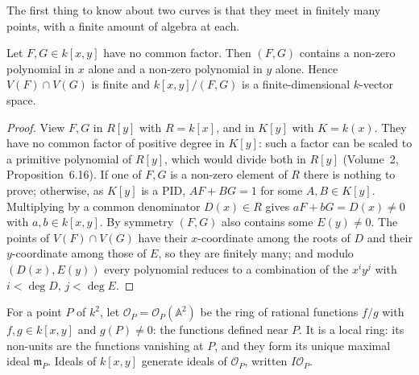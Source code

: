 The first thing to know about two curves is that they meet in finitely many points, with a finite amount of algebra at each.

\begin{lemma}\label{lem:finite}
Let $F,G\in k[x,y]$ have no common factor. Then $(F,G)$ contains a non-zero polynomial in $x$ alone and a non-zero polynomial in $y$ alone.
Hence $V(F)\cap V(G)$ is finite and $k[x,y]/(F,G)$ is a finite-dimensional $k$-vector space.
\end{lemma}
\begin{proof}
View $F,G$ in $R[y]$ with $R=k[x]$, and in $K[y]$ with $K=k(x)$. They have no common factor of positive degree in $K[y]$: such a factor can
be scaled to a primitive polynomial of $R[y]$, which would divide both in $R[y]$ (Volume~2, Proposition~6.16). If one of $F,G$ is a non-zero
element of $R$ there is nothing to prove; otherwise, as $K[y]$ is a PID, $AF+BG=1$ for some $A,B\in K[y]$. Multiplying by a common denominator
$D(x)\in R$ gives $aF+bG=D(x)\ne0$ with $a,b\in k[x,y]$. By symmetry $(F,G)$ also contains some $E(y)\ne0$. The points of $V(F)\cap V(G)$ have their
$x$-coordinate among the roots of $D$ and their $y$-coordinate among those of $E$, so they are finitely many; and modulo $(D(x),E(y))$ every
polynomial reduces to a combination of the $x^iy^j$ with $i<\deg D$, $j<\deg E$.
\end{proof}

For a point $P$ of $k^2$, let $\mathcal O_P=\mathcal O_P(\mathbb A^2)$ be the ring of rational functions $f/g$ with $f,g\in k[x,y]$ and $g(P)\ne0$:
the functions defined near $P$. It is a local ring: its non-units are the functions vanishing at $P$, and they form its unique maximal ideal
$\mathfrak m_P$. Ideals of $k[x,y]$ generate ideals of $\mathcal O_P$, written $I\mathcal O_P$.

